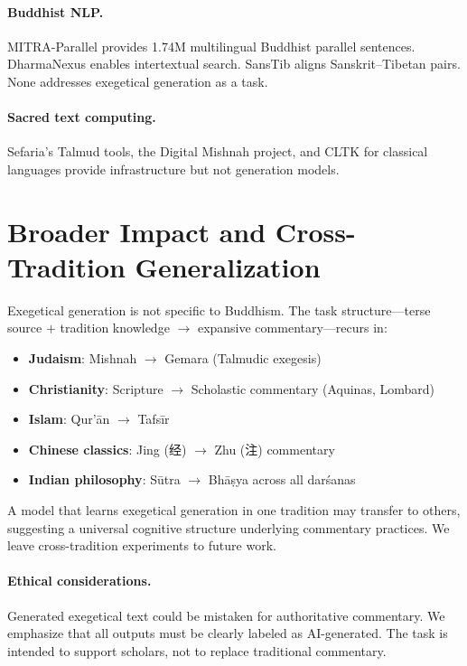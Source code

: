 \documentclass[11pt]{article}
\begin{document}
\paragraph{Buddhist NLP.}
MITRA-Parallel \cite{nehrdich2024mitra} provides 1.74M multilingual Buddhist parallel sentences. DharmaNexus \cite{nehrdich2023dharmanexus} enables intertextual search. SansTib \cite{nehrdich2022sanstib} aligns Sanskrit--Tibetan pairs. None addresses exegetical generation as a task.

\paragraph{Sacred text computing.}
Sefaria's Talmud tools, the Digital Mishnah project, and CLTK for classical languages provide infrastructure but not generation models.


\section{Broader Impact and Cross-Tradition Generalization}
\label{sec:broader}

Exegetical generation is not specific to Buddhism. The task structure---terse source $+$ tradition knowledge $\rightarrow$ expansive commentary---recurs in:

\begin{itemize}
    \item \textbf{Judaism}: Mishnah $\rightarrow$ Gemara (Talmudic exegesis)
    \item \textbf{Christianity}: Scripture $\rightarrow$ Scholastic commentary (Aquinas, Lombard)
    \item \textbf{Islam}: Qur'\=an $\rightarrow$ Tafs\=ir
    \item \textbf{Chinese classics}: Jing ($\text{经}$) $\rightarrow$ Zhu ($\text{注}$) commentary
    \item \textbf{Indian philosophy}: S\=utra $\rightarrow$ Bh\=a\d{s}ya across all dar\'sanas
\end{itemize}

A model that learns exegetical generation in one tradition may transfer to others, suggesting a universal cognitive structure underlying commentary practices. We leave cross-tradition experiments to future work.

\paragraph{Ethical considerations.}
Generated exegetical text could be mistaken for authoritative commentary. We emphasize that all outputs must be clearly labeled as AI-generated. The task is intended to support scholars, not to replace traditional commentary.
\end{document}
